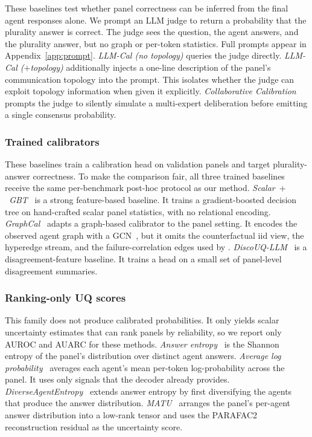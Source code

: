 These baselines test whether panel correctness can be inferred from the final agent responses alone. We prompt an LLM judge to return a probability that the plurality answer is correct. The judge sees the question, the agent answers, and the plurality answer, but no graph or per-token statistics. Full prompts appear in Appendix~\ref{app:prompt}. \emph{LLM-Cal (no topology)} queries the judge directly. \emph{LLM-Cal ($+$topology)} additionally injects a one-line description of the panel's communication topology into the prompt. This isolates whether the judge can exploit topology
information when given it explicitly. \emph{Collaborative
Calibration}~\citep{yang2024confidence} prompts the judge to silently simulate a multi-expert deliberation before emitting a single consensus probability.

\subsubsection{Trained calibrators}
\label{app:baselines-trained}

These baselines train a calibration head on validation panels and target plurality-answer correctness. To make the comparison fair, all three trained baselines receive the same per-benchmark post-hoc protocol as our method. \emph{Scalar~$+$~GBT}~\citep{ke2017lightgbm}
is a strong feature-based baseline. It trains a gradient-boosted decision tree on hand-crafted scalar panel statistics, with no relational encoding. \emph{GraphCal}~\citep{li2025graph} adapts a
graph-based calibrator to the panel setting. It encodes the observed agent graph with a GCN~\citep{kipf2017semisupervisedclassificationgraphconvolutional}, but it omits the counterfactual iid view, the hyperedge stream, and the failure-correlation edges used by \methodname{}.
\emph{DiscoUQ-LLM}~\citep{jiang2026discouq} is a disagreement-feature baseline. It trains a head on a small set of panel-level disagreement summaries.

\subsubsection{Ranking-only UQ scores}
\label{app:baselines-ranking}

This family does not produce calibrated probabilities. It only
yields scalar uncertainty estimates that can rank panels by
reliability, so we report only AUROC and AUARC for these methods. \emph{Answer entropy}~\citep{kuhn2023semanticuncertaintylinguisticinvariances} is the Shannon entropy of the panel's distribution over distinct agent answers. \emph{Average log probability}~%
\citep{kadavath2022languagemodelsmostlyknow} averages each agent's mean per-token log-probability across the panel. It uses only signals that the decoder already provides. \emph{DiverseAgentEntropy}~%
\citep{feng2025rethinkingllmuncertaintymultiagent} extends answer entropy by first diversifying the agents that produce the answer distribution. \emph{MATU}~\citep{chen2026responsecountsquantifyinguncertainty} arranges the panel's per-agent answer distribution into a low-rank tensor and uses the \textsc{PARAFAC2} reconstruction residual as the uncertainty score.

